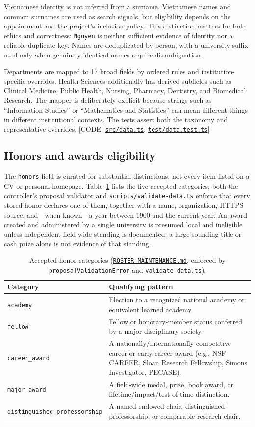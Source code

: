 \documentclass[11pt]{article}
\newcommand{\code}[1]{\texttt{\small #1}}
\newcommand{\ghrepo}{https://github.com/dynaroars/vietprofs}
\newcommand{\codelink}[1]{\href{\ghrepo/blob/main/#1}{\code{#1}}}
\newcommand{\codelinkd}[2]{\href{\ghrepo/blob/main/#1}{\code{#2}}}
\begin{document}
Vietnamese identity is not inferred from a surname.
Vietnamese names and common surnames are used as search signals, but eligibility depends on the appointment and the project's inclusion policy.
This distinction matters for both ethics and correctness: \code{Nguyen} is neither sufficient evidence of identity nor a reliable duplicate key.
Names are deduplicated by person, with a university suffix used only when genuinely identical names require disambiguation.

Departments are mapped to 17 broad fields by ordered rules and institution-specific overrides.
Health Sciences additionally has derived subfields such as Clinical Medicine, Public Health, Nursing, Pharmacy, Dentistry, and Biomedical Research.
The mapper is deliberately explicit because strings such as ``Information Studies'' or ``Mathematics and Statistics'' can mean different things in different institutional contexts.
The tests assert both the taxonomy and representative overrides.
[CODE: \codelink{src/data.ts}; \codelink{test/data.test.ts}]

\subsection{Honors and awards eligibility}
\label{sec:honors}
The \code{honors} field is curated for substantial distinctions, not every item listed on a CV or personal homepage.
Table~\ref{tab:honors} lists the five accepted categories; both the controller's proposal validator and \code{scripts/validate-data.ts} enforce that every stored honor declares one of them, together with a name, organization, HTTPS source, and---when known---a year between 1900 and the current year.
An award created and administered by a single university is presumed local and ineligible unless independent field-wide standing is documented; a large-sounding title or cash prize alone is not evidence of that standing.

\begin{table}[t]
\centering
\caption{Accepted honor categories (\codelinkd{ROSTER_MAINTENANCE.md}{ROSTER\_MAINTENANCE.md}, enforced by
\code{proposalValidationError} and \code{validate-data.ts}).}
\label{tab:honors}
\small
\begin{tabularx}{\linewidth}{@{}lX@{}}
\toprule
Category & Qualifying pattern \\
\midrule
\code{academy} & Election to a recognized national academy or equivalent learned academy. \\
\code{fellow} & Fellow or honorary-member status conferred by a major disciplinary society. \\
\code{career\_award} & A nationally/internationally competitive career or early-career award
(e.g., NSF CAREER, Sloan Research Fellowship, Simons Investigator, PECASE). \\
\code{major\_award} & A field-wide medal, prize, book award, or lifetime/impact/test-of-time
distinction. \\
\code{distinguished\_professorship} & A named endowed chair, distinguished professorship, or
comparable research chair. \\
\bottomrule
\end{tabularx}
\end{table}
\end{document}
